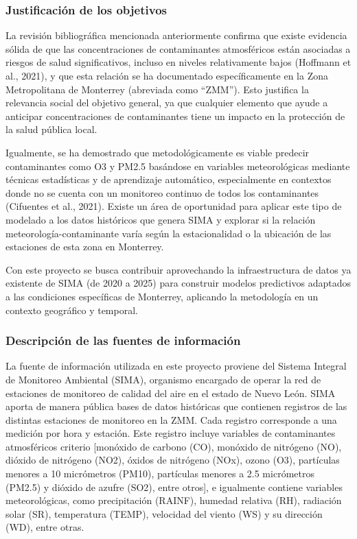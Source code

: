 \documentclass[
  letterpaper,
  DIV=11,
  numbers=noendperiod]{scrartcl}
\begin{document}
\subsubsection{Justificación de los
objetivos}\label{justificaciuxf3n-de-los-objetivos}

La revisión bibliográfica mencionada anteriormente confirma que existe
evidencia sólida de que las concentraciones de contaminantes
atmosféricos están asociadas a riesgos de salud significativos, incluso
en niveles relativamente bajos (Hoffmann et al., 2021), y que esta
relación se ha documentado específicamente en la Zona Metropolitana de
Monterrey (abreviada como ``ZMM''). Esto justifica la relevancia social
del objetivo general, ya que cualquier elemento que ayude a anticipar
concentraciones de contaminantes tiene un impacto en la protección de la
salud pública local.

Igualmente, se ha demostrado que metodológicamente es viable predecir
contaminantes como O3 y PM2.5 basándose en variables meteorológicas
mediante técnicas estadísticas y de aprendizaje automático,
especialmente en contextos donde no se cuenta con un monitoreo continuo
de todos los contaminantes (Cifuentes et al., 2021). Existe un área de
oportunidad para aplicar este tipo de modelado a los datos históricos
que genera SIMA y explorar si la relación meteorología-contaminante
varía según la estacionalidad o la ubicación de las estaciones de esta
zona en Monterrey.

Con este proyecto se busca contribuir aprovechando la infraestructura de
datos ya existente de SIMA (de 2020 a 2025) para construir modelos
predictivos adaptados a las condiciones específicas de Monterrey,
aplicando la metodología en un contexto geográfico y temporal.

\subsubsection{Descripción de las fuentes de
información}\label{descripciuxf3n-de-las-fuentes-de-informaciuxf3n}

La fuente de información utilizada en este proyecto proviene del Sistema
Integral de Monitoreo Ambiental (SIMA), organismo encargado de operar la
red de estaciones de monitoreo de calidad del aire en el estado de Nuevo
León. SIMA aporta de manera pública bases de datos históricas que
contienen registros de las distintas estaciones de monitoreo en la ZMM.
Cada registro corresponde a una medición por hora y estación. Este
registro incluye variables de contaminantes atmosféricos criterio
{[}monóxido de carbono (CO), monóxido de nitrógeno (NO), dióxido de
nitrógeno (NO2), óxidos de nitrógeno (NOx), ozono (O3), partículas
menores a 10 micrómetros (PM10), partículas menores a 2.5 micrómetros
(PM2.5) y dióxido de azufre (SO2), entre otros{]}, e igualmente contiene
variables meteorológicas, como precipitación (RAINF), humedad relativa
(RH), radiación solar (SR), temperatura (TEMP), velocidad del viento
(WS) y su dirección (WD), entre otras.
\end{document}
